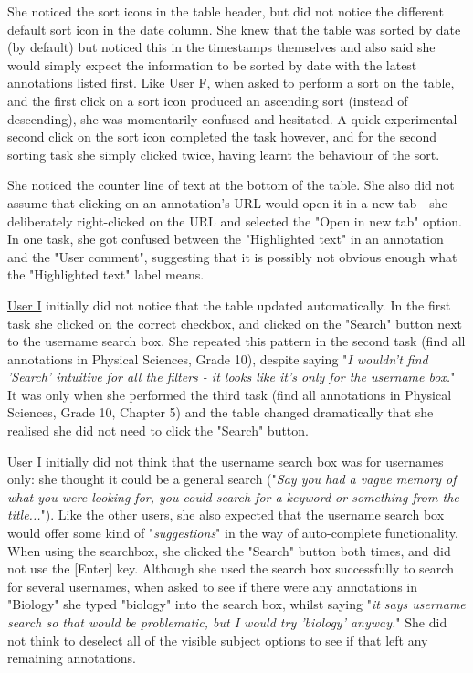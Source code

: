 She noticed the sort icons in the table header, but did not notice the different default sort icon in the date column. She knew that the table was sorted by date (by default) but noticed this in the timestamps themselves and also said she would simply expect the information to be sorted by date with the latest annotations listed first. Like User F, when asked to perform a sort on the table, and the first click on a sort icon produced an ascending sort (instead of descending), she was momentarily confused and hesitated. A quick experimental second click on the sort icon completed the task however, and for the second sorting task she simply clicked twice, having learnt the behaviour of the sort. 

She noticed the counter line of text at the bottom of the table. She also did not assume that clicking on an annotation's URL would open it in a new tab - she deliberately right-clicked on the URL and selected the "Open in new tab" option. In one task, she got confused between the "Highlighted text" in an annotation and the "User comment", suggesting that it is possibly not obvious enough what the "Highlighted text" label means. 

\underline{User I} initially did not notice that the table updated automatically. In the first task she clicked on the correct checkbox, and clicked on the "Search" button next to the username search box. She repeated this pattern in the second task (find all annotations in Physical Sciences, Grade 10), despite saying "\textit{I wouldn't find 'Search' intuitive for all the filters - it looks like it's only for the username box.}" It was only when she performed the third task (find all annotations in Physical Sciences, Grade 10, Chapter 5) and the table changed dramatically that she realised she did not need to click the "Search" button.  

User I initially did not think that the username search box was for usernames only: she thought it could be a general search ("\textit{Say you had a vague memory of what you were looking for, you could search for a keyword or something from the title...}"). Like the other users, she also expected that the username search box would offer some kind of "\textit{suggestions}" in the way of auto-complete functionality. When using the searchbox, she clicked the "Search" button both times, and did not use the [Enter] key. Although she used the search box successfully to search for several usernames, when asked to see if there were any annotations in "Biology" she typed "biology" into the search box, whilst saying "\textit{it says username search so that would be problematic, but I would try 'biology' anyway.}" She did not think to deselect all of the visible subject options to see if that left any remaining annotations. 

